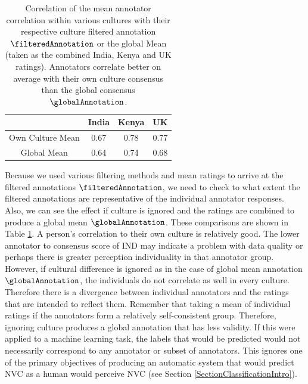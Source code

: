 

\begin{table}
\centering
\caption{Correlation of the mean annotator correlation within various cultures with their respective culture filtered annotation $\filteredAnnotation$ or the global Mean (taken as the combined India, Kenya and \ac{UK} ratings). Annotators correlate better on average with their own culture consensus than the global consensus $\globalAnnotation$.}
\begin{tabular}{ | c | c c c | }
\hline
 & India & Kenya & \ac{UK} \\
\hline
\hline
Own Culture Mean & 0.67 & 0.78 & 0.77 \\
Global Mean & 0.64 & 0.74 & 0.68 \\
\hline
\end{tabular}
\label{MeanAnnotatorCorrelationTable}
\end{table}

Because we used various filtering methods and mean ratings to arrive at the filtered annotations $\filteredAnnotation$, we need to check to what extent the filtered annotations are representative of the individual annotator responses. Also, we can see the effect if culture is ignored and the ratings are combined to produce a global mean $\globalAnnotation$.
These comparisons are shown in Table \ref{MeanAnnotatorCorrelationTable}. A person's correlation to their own culture is relatively good. The lower annotator to consensus score of IND may indicate a problem with data quality or perhaps there is greater perception individuality in that annotator group.
However, if cultural difference is ignored as in the case of global mean annotation $\globalAnnotation$, the individuals do not correlate as well in every culture. Therefore there is a divergence between individual annotators and the ratings that are intended to reflect them. Remember that taking a mean of individual ratings if the annotators form a relatively self-consistent group. Therefore, ignoring culture produces a global annotation that has less validity. If this were applied to a machine learning task, the labels that would be predicted would not necessarily correspond to any annotator or subset of annotators. This ignores one of the primary objectives of producing an automatic system that would predict \ac{NVC} as a human would perceive \ac{NVC} (see Section \ref{SectionClassificationIntro}).

